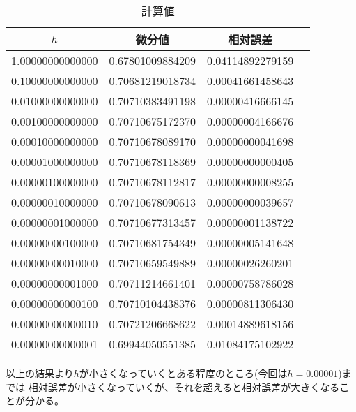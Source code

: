 \documentclass[uplatex,dvipdfmx,a4paper,10pt]{jsarticle}
\begin{document}
            \begin{table}[H]
                \begin{center}
                    \caption{計算値}
                    \begin{tabular}{cccc} \hline
                        $h$ & 微分値 & 相対誤差 \\ \hline
                        1.00000000000000 & 0.67801009884209 & 0.04114892279159 \\
                        0.10000000000000 & 0.70681219018734 & 0.00041661458643 \\
                        0.01000000000000 & 0.70710383491198 & 0.00000416666145 \\
                        0.00100000000000 & 0.70710675172370 & 0.00000004166676 \\
                        0.00010000000000 & 0.70710678089170 & 0.00000000041698 \\
                        0.00001000000000 & 0.70710678118369 & 0.00000000000405 \\
                        0.00000100000000 & 0.70710678112817 & 0.00000000008255 \\
                        0.00000010000000 & 0.70710678090613 & 0.00000000039657 \\
                        0.00000001000000 & 0.70710677313457 & 0.00000001138722 \\
                        0.00000000100000 & 0.70710681754349 & 0.00000005141648 \\
                        0.00000000010000 & 0.70710659549889 & 0.00000026260201 \\
                        0.00000000001000 & 0.70711214661401 & 0.00000758786028 \\
                        0.00000000000100 & 0.70710104438376 & 0.00000811306430 \\
                        0.00000000000010 & 0.70721206668622 & 0.00014889618156 \\
                        0.00000000000001 & 0.69944050551385 & 0.01084175102922 \\ \hline
                    \end{tabular}
                \end{center}
                \label{2-1-計算値}
            \end{table}

            \hspace{1em}以上の結果より$h$が小さくなっていくとある程度のところ(今回は$h=0.00001$)までは
            相対誤差が小さくなっていくが、それを超えると相対誤差が大きくなることが分かる。
\end{document}
